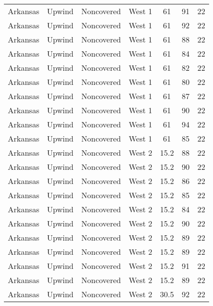 \documentclass{article}
\begin{document}
\begin{longtable}[H]{ccccccc}
Arkansas & Upwind    & Noncovered & West 1        & 61           & 91          & 22  \\
Arkansas & Upwind    & Noncovered & West 1        & 61           & 92          & 22  \\
Arkansas & Upwind    & Noncovered & West 1        & 61           & 88          & 22  \\
Arkansas & Upwind    & Noncovered & West 1        & 61           & 84          & 22  \\
Arkansas & Upwind    & Noncovered & West 1        & 61           & 82          & 22  \\
Arkansas & Upwind    & Noncovered & West 1        & 61           & 80          & 22  \\
Arkansas & Upwind    & Noncovered & West 1        & 61           & 87          & 22  \\
Arkansas & Upwind    & Noncovered & West 1        & 61           & 90          & 22  \\
Arkansas & Upwind    & Noncovered & West 1        & 61           & 94          & 22  \\
Arkansas & Upwind    & Noncovered & West 1        & 61           & 85          & 22  \\
Arkansas & Upwind    & Noncovered & West 2        & 15.2         & 88          & 22  \\
Arkansas & Upwind    & Noncovered & West 2        & 15.2         & 90          & 22  \\
Arkansas & Upwind    & Noncovered & West 2        & 15.2         & 86          & 22  \\
Arkansas & Upwind    & Noncovered & West 2        & 15.2         & 85          & 22  \\
Arkansas & Upwind    & Noncovered & West 2        & 15.2         & 84          & 22  \\
Arkansas & Upwind    & Noncovered & West 2        & 15.2         & 90          & 22  \\
Arkansas & Upwind    & Noncovered & West 2        & 15.2         & 89          & 22  \\
Arkansas & Upwind    & Noncovered & West 2        & 15.2         & 89          & 22  \\
Arkansas & Upwind    & Noncovered & West 2        & 15.2         & 91          & 22  \\
Arkansas & Upwind    & Noncovered & West 2        & 15.2         & 89          & 22  \\
Arkansas & Upwind    & Noncovered & West 2        & 30.5         & 92          & 22  \\

\end{longtable}
\end{document}
